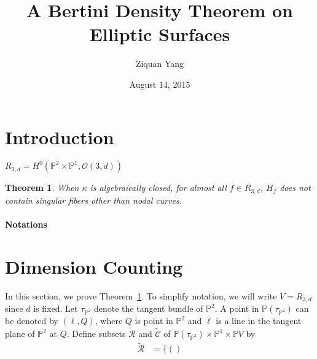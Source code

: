 \documentclass[12pt]{article}
\theoremstyle{plain}
\newtheorem{theorem}[equation]{Theorem}
\theoremstyle{definition}
\newcommand{\IP}{\mathbb{P}}
\newcommand{\sO}{\mathcal{O}}
\newcommand{\<}{\langle}
\renewcommand{\>}{\rangle}
\def\wt{\widetilde}
\newcommand{\shR}{\mathscr{R}}
\newcommand{\shC}{\mathscr{C}}
\begin{document}
%

\title{A Bertini Density Theorem on Elliptic Surfaces}
\author{Ziquan Yang}


\date{August 14, 2015}


\maketitle
 

\setcounter{section}{0}

\section{Introduction}

$R_{3, d} = H^0(\IP^2 \times \IP^1, \sO(3, d))$

\begin{theorem}
\label{bertini}
When $\kappa$ is algebraically closed, for almost all $f \in R_{3, d}$, $H_f$ does not contain singular fibers other than nodal curves. 
\end{theorem}

\paragraph{Notations}



\section{Dimension Counting}
In this section, we prove Theorem~\ref{bertini}. To simplify notation, we will write $V = R_{3, d}$ since $d$ is fixed. Let $\tau_{\IP^2}$ denote the tangent bundle of $\IP^2$. A point in $\IP(\tau_{\IP^2})$ can be denoted by $(\ell, Q)$, where $Q$ is point in $\IP^2$ and $\ell$ is a line in the tangent plane of $\IP^2$ at $Q$. Define subsets $\wt{\shR}$ and $\wt{\shC}$ of $\IP(\tau_{\IP^2}) \times \IP^1 \times \IP V$ by 
\begin{align*}
\wt{\shR} &= \{ ()
\end{align*}
\end{document}
